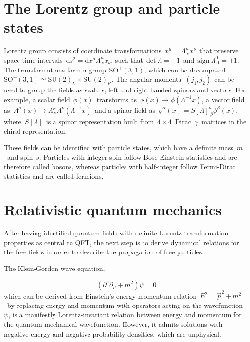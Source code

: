 \section{The Lorentz group and particle states}

Lorentz group consists of coordinate transformations~$x^\mu = \Lambda^{\mu}_{\ \nu} x^\nu$~that preserve space-time intervals~$\mathrm{d}s^2 = \mathrm{d}x^\mu \Lambda^\mu_{\ \nu} x_\nu$, such that~$\mathrm{det}\ \Lambda = +1$~and~$\mathrm{sign}\ \Lambda^0_{\ 0} = +1$. The transformations form a group~$\mathrm{SO}^+(3,1)$, which can be decomposed~$\mathrm{SO}^+(3,1) \simeq \mathrm{SU}(2)_L \times \mathrm{SU}(2)_R$. The angular momenta~$(j_1, j_2)$~can be used to group the fields as scalars, left and right handed spinors and vectors. For example, a scalar field~$\phi(x)$~transforms as~$\phi(x) \rightarrow \phi(\Lambda^{-1} x)$, a vector field as~$A^\mu(x) \rightarrow \Lambda^\mu_{\ \nu} A^\nu(\Lambda^{-1}x)$~and a spinor field as~$\phi^\alpha(x) = S[\Lambda]^a_{\ \beta} \phi^\beta(x)$, where~$S[\Lambda]$~is a spinor representation built from~$4\times4$~Dirac~$\gamma$~matrices in the chiral representation.

These fields can be identified with particle states, which have a definite mass~$m$~and spin~$s$. Particles with integer spin follow Bose-Einstein statistics and are therefore called bosons, whereas particles with half-integer follow Fermi-Dirac statistics and are called fermions. 

\section{Relativistic quantum mechanics}
After having identified quantum fields with definite Lorentz transformation properties as central to QFT, the next step is to derive dynamical relations for the free fields in order to describe the propagation of free particles.

The Klein-Gordon wave equation,

\begin{equation}
\label{eq:theory_klein_gordon}
(\partial^\mu \partial_\mu + m^2) \psi = 0
\end{equation}
which can be derived from Einstein's energy-momentum relation~$E^2 = \vec{p}^2 + m^2$~by replacing energy and momentum with operators acting on the wavefunction~$\psi$, is a manifestly Lorentz-invariant relation between energy and momentum for the quantum mechanical wavefunction. However, it admits solutions with negative energy and negative probability densities, which are unphysical.

